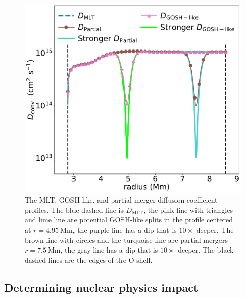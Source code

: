\begin{figure}[!htbp]
\includegraphics[width=\textwidth]{chapters/2/figures/Dmlt_partial_gosh.pdf}
\caption{The MLT, GOSH-like, and partial merger diffusion coefficient profiles. The blue dashed line is $D_{\mathrm{MLT}}$, the pink line with triangles and lime line are potential GOSH-like splits in the profile centered at $r=4.95~\mathrm{Mm}$, the purple line has a dip that is $10\times$ deeper. The brown line with circles and the turquoise line are partial mergers $r=7.5~\mathrm{Mm}$, the gray line has a dip that is $10\times$ deeper. The black dashed lines are the edges of the O-shell.
\label{fig:dgosh_partial}}
\end{figure}

\subsection{Determining nuclear physics impact}\label{sec:nuclear_methods}

